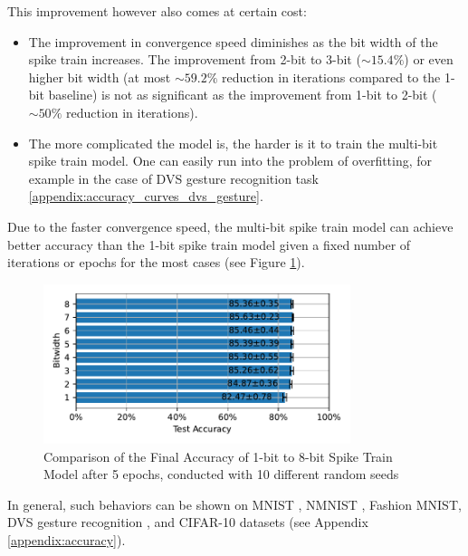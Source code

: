    This improvement however also comes at certain cost:
    \begin{itemize}
        \item The improvement in convergence speed diminishes as the bit width of the spike train increases. The improvement from 2-bit to 3-bit ($\sim 15.4\%$) or even higher bit width (at most $\sim 59.2\%$ reduction in iterations compared to the 1-bit baseline) is not as significant as the improvement from 1-bit to 2-bit ($\sim 50\%$ reduction in iterations).
        \item The more complicated the model is, the harder is it to train the multi-bit spike train model. One can easily run into the problem of overfitting, for example in the case of DVS gesture recognition task \ref{appendix:accuracy_curves_dvs_gesture}.
    \end{itemize}

    Due to the faster convergence speed, the multi-bit spike train model can achieve better accuracy than the 1-bit spike train model given a fixed number of iterations or epochs for the most cases (see Figure \ref{fig:final_accuracy}).
    \begin{figure}[!htpb]
        \centering
        \includegraphics[width=0.8\textwidth]{../standard/FashionMNIST/plots/fashionmnist_final_acc_horizontal.pdf}
        \caption{Comparison of the Final Accuracy of 1-bit to 8-bit Spike Train Model after 5 epochs, conducted with 10 different random seeds}
        \label{fig:final_accuracy}
    \end{figure}

    In general, such behaviors can be shown on MNIST \cite{deng2012mnist}, NMNIST \cite{10.3389/fnins.2015.00437}, Fashion MNIST, DVS gesture recognition \cite{8100264}, and CIFAR-10 datasets (see Appendix \ref{appendix:accuracy}).

